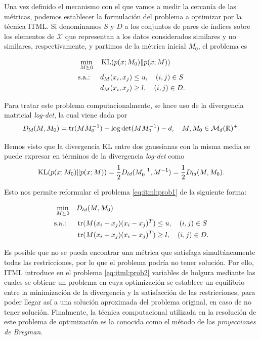 \documentclass{book}
\begin{document}
Una vez definido el mecanismo con el que vamos a medir la cercanía de las métricas, podemos establecer la formulación del problema a optimizar por la técnica ITML. Si denominamos $S$ y $D$ a los conjuntos de pares de índices sobre los elementos de $\mathcal{X}$ que representan a los datos considerados similares y no similares, respectivamente, y partimos de la métrica inicial $M_0$, el problema es

\begin{equation} \label{eq:itml:prob1}
	\begin{split}
	\min_{M \succeq 0} &\quad \operatorname{KL}(p(x;M_0)\|p(x;M))  \\
	\text{s.a.: } &\quad d_M(x_i,x_j) \le u, \quad (i,j) \in S \\
	              &\quad d_M(x_i,x_j) \ge l, \quad (i,j) \in D.
	\end{split}
\end{equation}

Para tratar este problema computacionalmente, se hace uso de la divergencia matricial \emph{log-det}, la cual viene dada por
\[ D_{ld}(M,M_0) = \operatorname{tr}(MM_0^{-1}) - \log\det(MM_0^{-1}) -d, \quad M,M_0 \in \mathcal{M}_d(\mathbb{R})^+. \]

Hemos visto que la divergencia KL entre dos gaussianas con la misma media se puede expresar en términos de la divergencia \emph{log-det} como
\[ \operatorname{KL}(p(x;M_0)\|p(x;M)) = \frac{1}{2}D_{ld}(M_0^{-1},M^{-1}) = \frac{1}{2}D_{ld}(M,M_0). \]

Esto nos permite reformular el problema \ref{eq:itml:prob1} de la siguiente forma:

\begin{equation} \label{eq:itml:prob2}
	\begin{split}
	\min_{M \succeq 0} &\quad D_{ld}(M,M_0)  \\
	\text{s.a.: } &\quad \operatorname{tr}(M(x_i-x_j)(x_i-x_j)^T) \le u, \quad (i,j) \in S \\
	              &\quad \operatorname{tr}(M(x_i-x_j)(x_i-x_j)^T) \ge l, \quad (i,j) \in D.
	\end{split}
\end{equation}

Es posible que no se pueda encontrar una métrica que satisfaga simultáneamente todas las restricciones, por lo que el problema podría no tener solución. Por ello, ITML introduce en el problema \ref{eq:itml:prob2} variables de holgura mediante las cuales se obtiene un problema en cuya optimización se establece un equilibrio entre la minimización de la divergencia y la satisfacción de las restricciones, para poder llegar así a una solución aproximada del problema original, en caso de no tener solución. Finalmente, la técnica computacional utilizada en la resolución de este problema de optimización es la conocida como el método de las \emph{proyecciones de Bregman}.
\end{document}
